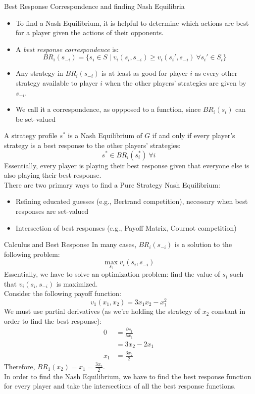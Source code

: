 \documentclass[10pt]{extarticle}
\begin{document}
  \begin{problem}{Best Response Correspondence and finding Nash Equilibria}
    \begin{itemize}
      \item To find a Nash Equilibrium, it is helpful to determine which actions are best for a player given the actions of their opponents.
      \item A \textit{best response correspondence} is:
        \[
          BR_i(s_{-i}) = \{s_i\in S\mid v_i(s_i,s_{-i}) \geq v_i(s_i', s_{-i})~\forall s_i'\in S_i\}
        \] 
      \item Any strategy in $BR_i(s_{-i})$ is at least as good for player $i$ as every other strategy available to player $i$ when the other players' strategies are given by $s_{-i}$.
      \item We call it a correspondence, as oppposed to a function, since $BR_i(s_i)$ can be set-valued
    \end{itemize}
    A strategy profile $s^*$ is a Nash Equilibrium of $G$ if and only if every player's strategy is a best response to the other players' strategies:
    \[
      s^* \in BR_i(s^*_i)~\forall i
    \] 
    Essentially, every player is playing their best response given that everyone else is also playing their best response.\\

    There are two primary ways to find a Pure Strategy Nash Equilibrium:
    \begin{itemize}
      \item Refining educated guesses (e.g., Bertrand competition), necessary when best responses are set-valued
      \item Intersection of best responses (e.g., Payoff Matrix, Cournot competition)
    \end{itemize}
  \end{problem}
  \begin{problem}{Calculus and Best Response}
    In many cases, $BR_i(s_{-i})$ is a solution to the following problem:
    \[
      \max_{s_i}v_i(s_i,s_{-i})
    \] 
    Essentially, we have to solve an optimization problem: find the value of $s_i$ such that $v_i(s_i,s_{-i})$ is maximized.\\

    Consider the following payoff function:
    \[
      v_1(x_1,x_2) = 3x_1x_2 - x_1^2
    \] 
    We must use partial derivatives (as we're holding the strategy of $x_2$ constant in order to find the best response):
    \begin{align*}
      0 &= \frac{\partial v_1}{\partial x_1}\\
        &= 3x_2 - 2x_1\\
      x_1 &= \frac{3x_2}{2}
    \end{align*}
    Therefore, $BR_1(x_2) = x_1 = \frac{3x_2}{2}$.\\

    In order to find the Nash Equilibrium, we have to find the best response function for every player and take the intersections of all the best response functions.
  \end{problem}
\end{document}
